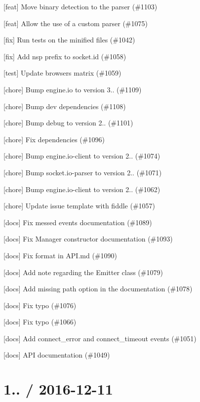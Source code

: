 \begin{DoxyItemize}
\item \mbox{[}feat\mbox{]} Move binary detection to the parser (\#1103)
\item \mbox{[}feat\mbox{]} Allow the use of a custom parser (\#1075)
\item \mbox{[}fix\mbox{]} Run tests on the minified files (\#1042)
\item \mbox{[}fix\mbox{]} Add nsp prefix to socket.\+id (\#1058)
\item \mbox{[}test\mbox{]} Update browsers matrix (\#1059)
\item \mbox{[}chore\mbox{]} Bump engine.\+io to version 3.. (\#1109)
\item \mbox{[}chore\mbox{]} Bump dev dependencies (\#1108)
\item \mbox{[}chore\mbox{]} Bump debug to version 2.. (\#1101)
\item \mbox{[}chore\mbox{]} Fix dependencies (\#1096)
\item \mbox{[}chore\mbox{]} Bump engine.\+io-\/client to version 2.. (\#1074)
\item \mbox{[}chore\mbox{]} Bump socket.\+io-\/parser to version 2.. (\#1071)
\item \mbox{[}chore\mbox{]} Bump engine.\+io-\/client to version 2.. (\#1062)
\item \mbox{[}chore\mbox{]} Update issue template with fiddle (\#1057)
\item \mbox{[}docs\mbox{]} Fix messed events documentation (\#1089)
\item \mbox{[}docs\mbox{]} Fix Manager constructor documentation (\#1093)
\item \mbox{[}docs\mbox{]} Fix format in A\+P\+I.\+md (\#1090)
\item \mbox{[}docs\mbox{]} Add note regarding the Emitter class (\#1079)
\item \mbox{[}docs\mbox{]} Add missing path option in the documentation (\#1078)
\item \mbox{[}docs\mbox{]} Fix typo (\#1076)
\item \mbox{[}docs\mbox{]} Fix typo (\#1066)
\item \mbox{[}docs\mbox{]} Add {\ttfamily connect\+\_\+error} and {\ttfamily connect\+\_\+timeout} events (\#1051)
\item \mbox{[}docs\mbox{]} A\+PI documentation (\#1049)
\end{DoxyItemize}

\section*{1.. / 2016-\/12-\/11 }


